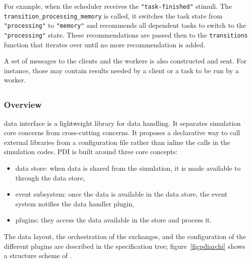 For example, when the scheduler receives the \texttt{"task-finished"} stimuli. The \texttt{transition\_processing\_memory} is called, it switches the task state from \texttt{"processing"} to \texttt{"memory"} and recommends all dependent tasks to switch to the \texttt{"processing"} state. These recommendations are passed then to the \texttt{transitions} function that iterates over until no more recommendation is added.

A set of messages to the clients and the workers is also constructed and sent. For instance, those may contain results needed by a client or a task to be run by a worker.


\subsection{\pdi}\label{sec:pdi}
\subsubsection{Overview}\label{sec:pdioverview}

\pdi\cite{roussel:hal-01587075} data interface is a lightweight library for data handling. It separates simulation core concerns from cross-cutting concerns. It proposes a declarative way to call external libraries from a configuration file rather than inline the calls in the simulation codes. 
PDI is built around three core concepts: 
\begin{itemize}
    \item data store: when data is shared from the simulation, it is made available to \pdi through the data store,
    \item event subsystem: once the data is available in the data store, the event system notifies the data handler plugin,
    \item plugins: they access the data available in the store and process it.   
\end{itemize}
The data layout, the orchestration of the exchanges, and the configuration of the different plugins are described in the specification tree; figure~\ref {figpdiarchi} shows a structure scheme of \pdi\cite{noauthor_pdi_nodate}.  


